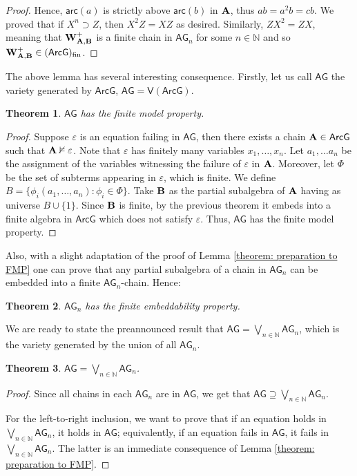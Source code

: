 \documentclass{amsart}
\newtheorem{theorem}{Theorem}[section]
\theoremstyle{definition}
\numberwithin{equation}{section}
\newcommand{\alg}[1]{{\textbf{\upshape #1}}}  %
\newcommand{\vv}[1]{\mathsf {#1}}
\newcommand{\arc}[1]{{\vv{arc}}(#1)}
\newcommand{\BlockG}{\vv{ArcG}}
\newcommand{\BG}{\vv{AG}}
\begin{document}
\begin{proof}
   Hence, $\arc a$ is strictly above $\arc b$ in $\alg A$, thus $ab = a^2b = cb$. We proved that if $X^n \supset Z$, then $X^2Z=XZ$ as desired. Similarly, $ZX^2=ZX$, meaning that $\alg W_{\alg A, \alg B}^+ $ is a finite chain in $\BG_{n}$ for some $n \in \mathbb{N}$ and so $\alg W_{\alg A, \alg B}^+ \in (\BlockG)_{\rm fin}$.
\end{proof}
The above lemma has several interesting consequence. Firstly, let us call $\BG$ the variety generated by $\BlockG$, $\BG = \vv V (\BlockG)$.
\begin{theorem}\label{corollary: FMP for V(BG)}	
$\BG$ has the finite model property.
\end{theorem}
\begin{proof}
	Suppose $\varepsilon$ is an equation failing in $\BG$, then there exists a chain $\alg A \in \BlockG$ such that $\alg A \nvDash \varepsilon$. Note that $\varepsilon$ has finitely many variables $x_1, \dots , x_n$. Let $a_1, \dots a_n$ be the assignment of the variables witnessing the failure of $\varepsilon$ in $\alg A$. Moreover, let $\Phi$ be the set of subterms appearing in $\varepsilon$, which is finite. We define $B=\{\phi_i(a_1, \dots, a_n) : \phi_i \in \Phi \}$. Take $\alg B$ as the partial subalgebra of $\alg A$ having as universe $B \cup \{1\}$. Since $\alg B$ is finite, by the previous theorem it embeds into a finite algebra in $\BlockG$ which does not satisfy $\varepsilon$. Thus, $\BG$ has the finite model property.
\end{proof}

Also, with a slight adaptation of the proof of Lemma \ref{theorem: preparation to FMP} one can prove that any partial subalgebra of a chain in $\BG_n$ can be embedded into a finite $\BG_n$-chain. Hence:
\begin{theorem}\label{corollary: FEP e FMP for Bn}
	$\BG_{n}$ has the finite embeddability property. 
\end{theorem}
We are ready to state the preannounced result that $\BG=\bigvee_{n \in \mathbb{N}}\BG_{n}$, which is the variety generated by the union of all $\BG_{n}$. 
\begin{theorem}\label{lemma: partial gluing of archimedean components}
	$\BG= \bigvee_{n \in \mathbb{N}}\BG_{n}$.
\end{theorem}
\begin{proof}
Since all chains in each $\BG_n$ are in $\BG$, we get that ${\BG} \supseteq \bigvee_{n \in \mathbb{N}}\BG_{n}$. 

For the left-to-right inclusion, we want to prove that if an equation holds  in $\bigvee_{n \in \mathbb{N}}\BG_{n}$, it holds in $\BG$; equivalently, if an equation fails in $\BG$, it fails in $\bigvee_{n \in \mathbb{N}}\BG_{n}$. The latter is an immediate consequence of Lemma \ref{theorem: preparation to FMP}.
\end{proof}
\end{document}
